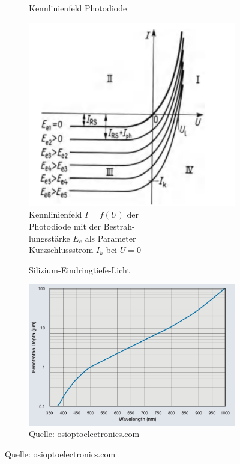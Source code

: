 \begin{figure}[H]
  \begin{subfigure}[b]{0.4\textwidth}
  \caption{Kennlinienfeld Photodiode}
    \includegraphics[width=\textwidth]{img/Photodiode-Kennline.png}
    \caption*{Kennlinienfeld $I=f(U)$ der \\Photodiode mit der Bestrah-\\lungsstärke $E_e$ als Parameter\\Kurzschlussstrom $I_k$ bei $U=0$}
    \label{fig:PhotodiodeKennline}
  \end{subfigure}
  \begin{subfigure}[b]{0.6\textwidth}
    \caption{Silizium-Eindringtiefe-Licht}
    \includegraphics[width=\textwidth]{img/Silizium-Eindringtiefe-Licht.png}
    \caption*{Quelle: osioptoelectronics.com}
  \label{fig:Silizium-eindingtiefe}
  \end{subfigure}
\end{figure}







